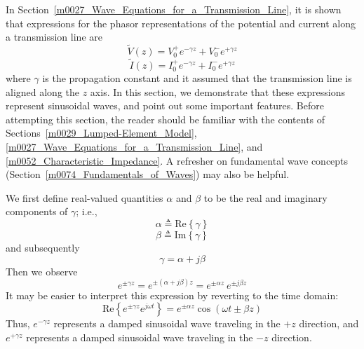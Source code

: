 

\label{m0080_Wave_Propagation_on_a_Transmission_Line} %

In Section~\ref{m0027_Wave_Equations_for_a_Transmission_Line}, it is shown that expressions for the phasor representations of the potential and current along a transmission line are
%
\begin{equation}
\widetilde{V}(z) = V_0^+ e^{-\gamma z} + V_0^- e^{+\gamma z}
\label{m0080_eV}
\end{equation}
%
\begin{equation}
\widetilde{I}(z) = I_0^+ e^{-\gamma z} + I_0^- e^{+\gamma z}
\label{m0080_eI}
\end{equation}
%
where $\gamma$ is the propagation constant and it assumed that the transmission line is aligned along the $z$ axis.
In this section, we demonstrate that these expressions represent sinusoidal waves, and point out some important features.
Before attempting this section, the reader should be familiar with the contents of Sections~\ref{m0029_Lumped-Element_Model}, \ref{m0027_Wave_Equations_for_a_Transmission_Line}, and \ref{m0052_Characteristic_Impedance}.
A refresher on fundamental wave concepts (Section~\ref{m0074_Fundamentals_of_Waves}) may also be helpful.

We first define real-valued quantities $\alpha$ and $\beta$ to be the real and imaginary components of $\gamma$; i.e.,
%
\begin{equation}
\alpha \triangleq \mbox{Re}\left\{\gamma\right\}
\end{equation}
%
\begin{equation}
\beta \triangleq \mbox{Im}\left\{\gamma\right\}
\end{equation}
%
and subsequently
%
\begin{equation}
\gamma = \alpha + j\beta
\end{equation}
%
Then we observe
%
\begin{equation}
e^{\pm\gamma z} = e^{\pm\left(\alpha+j\beta\right)z} = e^{\pm\alpha z}~e^{\pm j\beta z}
\end{equation}
% 
It may be easier to interpret this expression by reverting to the time domain:
%
\begin{equation}
\mbox{Re}\left\{e^{\pm\gamma z}e^{j\omega t} \right\} = e^{\pm\alpha z}\cos\left(\omega t \pm \beta z\right)
\end{equation}
%
Thus, 
$e^{-\gamma z}$ represents a damped sinusoidal wave traveling in the $+z$ direction, and 
$e^{+\gamma z}$ represents a damped sinusoidal wave traveling in the $-z$ direction.
   
